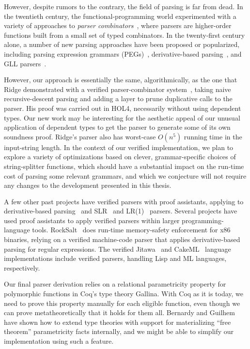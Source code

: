   
    However, despite rumors to the contrary, the field of parsing is far from dead.  In the twentieth century, the functional-programming world experimented with a variety of approaches to \emph{parser combinators}~\cite{pcomb}, where parsers are higher-order functions built from a small set of typed combinators.  In the twenty-first century alone, a number of new parsing approaches have been proposed or popularized, including parsing expression grammars (PEGs)~\cite{PEG}, derivative-based parsing~\cite{Derivs}, and GLL parsers~\cite{GLL}.

  However, our approach is essentially the same, algorithmically, as the one that Ridge demonstrated with a verified parser-combinator system~\cite{Ridge}, taking naive recursive-descent parsing and adding a layer to prune duplicative calls to the parser.  His proof was carried out in HOL4, necessarily without using dependent types.  Our new work may be interesting for the aesthetic appeal of our unusual application of dependent types to get the parser to generate some of its own soundness proof.  Ridge's parser also has worst-case $O(n^5)$ running time in the input-string length.  In the context of our verified implementation, we plan to explore a variety of optimizations based on clever, grammar-specific choices of string-splitter functions, which should have a substantial impact on the run-time cost of parsing some relevant grammars, and which we conjecture will not require any changes to the development presented in this thesis.

  A few other past projects have verified parsers with proof assistants, applying to derivative-based parsing~\cite{DerivsCoq} and SLR~\cite{SLR} and LR(1)~\cite{LR1} parsers.  Several projects have used proof assistants to apply verified parsers within larger programming-language tools.  RockSalt~\cite{RockSalt} does run-time memory-safety enforcement for x86 binaries, relying on a verified machine-code parser that applies derivative-based parsing for regular expressions.  The verified Jitawa~\cite{Jitawa} and CakeML~\cite{CakeML} language implementations include verified parsers, handling Lisp and ML languages, respectively.

  Our final parser derivation relies on a relational parametricity property for polymorphic functions in Coq's type theory Gallina.  With Coq as it is today, we need to prove this property manually for each eligible function, even though we can prove metatheoretically that it holds for them all.  Bernardy and Guilhem~\cite{InColor} have shown how to extend type theories with support for materializing ``free theorem'' parametricity facts internally, and we might be able to simplify our implementation using such a feature.

